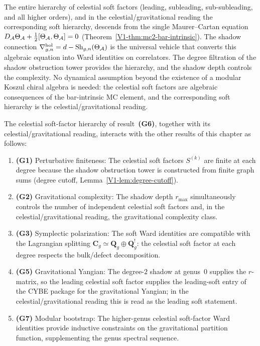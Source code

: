 \begin{remark}
The entire hierarchy of celestial soft factors (leading,
subleading, sub-subleading, and all higher orders), and in the
celestial/gravitational reading the corresponding soft
hierarchy, descends from
the single Maurer--Cartan equation
$D_{\mathcal{A}}\Theta_{\mathcal{A}} + \tfrac{1}{2}[\Theta_{\mathcal{A}},\Theta_{\mathcal{A}}] = 0$
(Theorem~\ref*{V1-thm:mc2-bar-intrinsic}). The shadow connection
$\nabla^{\mathrm{hol}}_{g,n} = d - \operatorname{Sh}_{g,n}(\Theta_{\mathcal{A}})$ is
the universal vehicle that converts this algebraic equation into
Ward identities on correlators. The degree filtration of the
shadow obstruction tower provides the hierarchy, and the shadow
depth controls the complexity. No dynamical assumption beyond
the existence of a modular Koszul chiral algebra is needed:
the celestial soft factors are algebraic consequences of the
bar-intrinsic MC element, and the corresponding soft
hierarchy is the celestial/gravitational reading.
\end{remark}

\begin{remark}
The celestial soft-factor hierarchy of result~\textbf{(G6)},
together with its celestial/gravitational reading, interacts with
the other results of this chapter as follows:
\begin{enumerate}[label=\textup{(\alph*)}]
\item \textbf{(G1)} Perturbative finiteness: The celestial soft factors
 $S^{(k)}$ are finite at each degree because the shadow
 obstruction tower is constructed from finite graph sums
 (degree cutoff, Lemma~\ref{V1-lem:degree-cutoff}).
\item \textbf{(G2)} Gravitational complexity: The shadow depth
 $r_{\max}$ simultaneously controls the number of independent
 celestial soft factors and, in the celestial/gravitational
 reading, the gravitational complexity class.
\item \textbf{(G3)} Symplectic polarization: The soft Ward
 identities are compatible with the Lagrangian splitting
 $\mathbf{C}_g \simeq \mathbf{Q}_g \oplus \mathbf{Q}_g^!$:
 the celestial soft factor at each degree respects the bulk/defect
 decomposition.
\item \textbf{(G5)} Gravitational Yangian: The degree-$2$ shadow
 at genus~$0$ supplies the $r$-matrix, so the leading celestial soft
 factor supplies the leading-soft entry of the CYBE package for
 the gravitational Yangian; in the celestial/gravitational
 reading this is read as the leading soft statement.
\item \textbf{(G7)} Modular bootstrap: The higher-genus celestial
 soft-factor Ward identities provide inductive constraints on the
 gravitational partition function, supplementing the genus
 spectral sequence.
\end{enumerate}
\end{remark}

